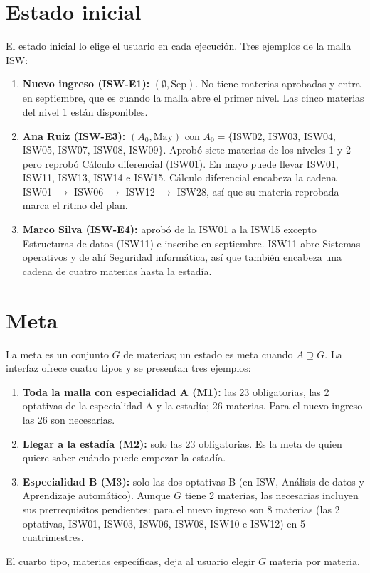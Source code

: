 \section{Estado inicial}
El estado inicial lo elige el usuario en cada ejecución. Tres ejemplos de la malla ISW:
\begin{enumerate}
    \item \textbf{Nuevo ingreso (ISW-E1):} $(\emptyset, \text{Sep})$. No tiene materias aprobadas y entra en septiembre, que es cuando la malla abre el primer nivel. Las cinco materias del nivel 1 están disponibles.
    \item \textbf{Ana Ruiz (ISW-E3):} $(A_0, \text{May})$ con $A_0 = \{$ISW02, ISW03, ISW04, ISW05, ISW07, ISW08, ISW09$\}$. Aprobó siete materias de los niveles 1 y 2 pero reprobó Cálculo diferencial (ISW01). En mayo puede llevar ISW01, ISW11, ISW13, ISW14 e ISW15. Cálculo diferencial encabeza la cadena ISW01 $\to$ ISW06 $\to$ ISW12 $\to$ ISW28, así que su materia reprobada marca el ritmo del plan.
    \item \textbf{Marco Silva (ISW-E4):} aprobó de la ISW01 a la ISW15 excepto Estructuras de datos (ISW11) e inscribe en septiembre. ISW11 abre Sistemas operativos y de ahí Seguridad informática, así que también encabeza una cadena de cuatro materias hasta la estadía.
\end{enumerate}

\section{Meta}
La meta es un conjunto $G$ de materias; un estado es meta cuando $A \supseteq G$. La interfaz ofrece cuatro tipos y se presentan tres ejemplos:
\begin{enumerate}
    \item \textbf{Toda la malla con especialidad A (M1):} las 23 obligatorias, las 2 optativas de la especialidad A y la estadía; 26 materias. Para el nuevo ingreso las 26 son necesarias.
    \item \textbf{Llegar a la estadía (M2):} solo las 23 obligatorias. Es la meta de quien quiere saber cuándo puede empezar la estadía.
    \item \textbf{Especialidad B (M3):} solo las dos optativas B (en ISW, Análisis de datos y Aprendizaje automático). Aunque $G$ tiene 2 materias, las necesarias incluyen sus prerrequisitos pendientes: para el nuevo ingreso son 8 materias (las 2 optativas, ISW01, ISW03, ISW06, ISW08, ISW10 e ISW12) en 5 cuatrimestres.
\end{enumerate}
El cuarto tipo, materias específicas, deja al usuario elegir $G$ materia por materia.

